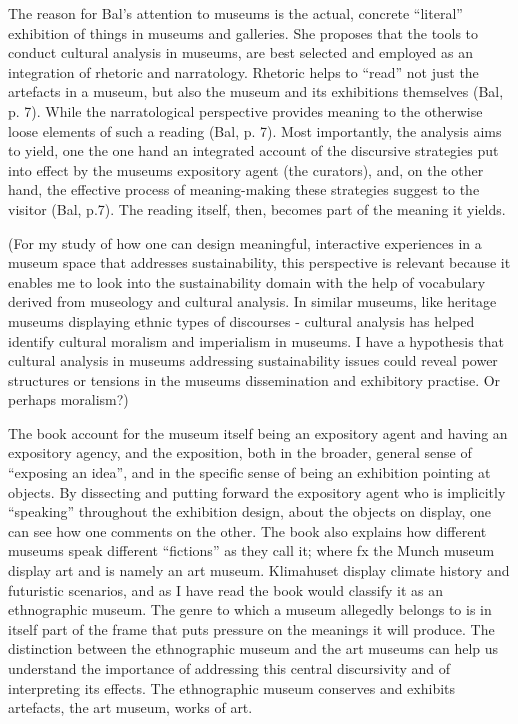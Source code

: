 The reason for Bal’s attention to museums is the actual, concrete “literal” exhibition of things in museums and galleries. She proposes that the tools to conduct cultural analysis in museums, are best selected and employed as an integration of rhetoric and narratology. Rhetoric helps to “read” not just the artefacts in a museum, but also the museum and its exhibitions themselves (Bal, p. 7). While the narratological perspective provides meaning to the otherwise loose elements of such a reading (Bal, p. 7). Most importantly, the analysis aims to yield, one the one hand an integrated account of the discursive strategies put into effect by the museums expository agent (the curators), and, on the other hand, the effective process of meaning-making these strategies suggest to the visitor (Bal, p.7). The reading itself, then, becomes part of the meaning it yields.

(For my study of how one can design meaningful, interactive experiences in a museum space that addresses sustainability, this perspective is relevant because it enables me to look into the sustainability domain with the help of vocabulary derived from museology and cultural analysis. In similar museums, like heritage museums displaying ethnic types of discourses - cultural analysis has helped identify cultural moralism and imperialism in museums. I have a hypothesis that cultural analysis in museums addressing sustainability issues could reveal power structures or tensions in the museums dissemination and exhibitory practise. Or perhaps moralism?)

The book account for the museum itself being an expository agent and having an expository agency, and the exposition, both in the broader, general sense of “exposing an idea”, and in the specific sense of being an exhibition pointing at objects. By dissecting and putting forward the expository agent who is implicitly “speaking” throughout the exhibition design, about the objects on display, one can see how one comments on the other. The book also explains how different museums speak different “fictions” as they call it; where fx the Munch museum display art and is namely an art museum. Klimahuset display climate history and futuristic scenarios, and as I have read the book would classify it as an ethnographic museum. The genre to which a museum allegedly belongs to is in itself part of the frame that puts pressure on the meanings it will produce. The distinction between the ethnographic museum and the art museums can help us understand the importance of addressing this central discursivity and of interpreting its effects. The ethnographic museum conserves and exhibits artefacts, the art museum, works of art.

